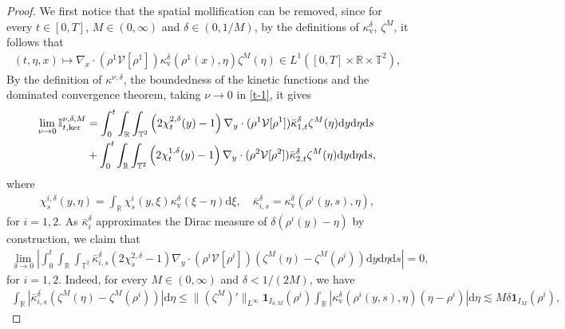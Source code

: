 \begin{proof}
We first notice that the spatial mollification can be removed, since for every $t\in[0,T]$, $M\in(0,\infty)$ and $\delta\in(0,1/M)$, by the definitions of $\kappa_{\mathrm{v}}^{\delta}$, $\zeta^M$, it follows that
\begin{align*}
(t, \eta, x) \mapsto \nabla_x\cdot \left( \rho^1 \mathcal{V}[\rho^1] \right) {\kappa}_{\mathrm{v}}^{\delta}\left(\rho^1(x),\eta\right)\zeta^M(\eta) \in L^1([0,T]\times\mathbb{R}\times\mathbb{T}^2),
\end{align*}
By  the
definition of $\kappa^{\nu,\delta}$, the boundedness of the kinetic functions and the dominated convergence theorem,  taking $\nu\rightarrow 0$ in \eqref{t-1}, it gives
\begin{align}\label{WS kernel delta}
\lim_{\nu\rightarrow 0}\mathbb{I}^{\nu,\delta,M}_{t,\mathrm{ker}}
&= \int^t_0\int_{\mathbb{R}}\int_{\mathbb{T}^2}\left(2\chi^{2,\delta}_t(y)-1\right)  \nabla_y\cdot (\rho^1 \mathcal{V}[\rho^1] ) \bar{\kappa}^{\delta}_{1,t}\zeta^M(\eta)\mathrm{d}y\mathrm{d}\eta\mathrm{d}s\\ \notag
& + \int^t_0\int_{\mathbb{R}}\int_{\mathbb{T}^2}\left(2\chi^{1,\delta}_t(y)-1\right)  \nabla_y\cdot(\rho^2  \mathcal{V}[\rho^2] ) \bar{\kappa}^{\delta}_{2,t}\zeta^M(\eta)\mathrm{d}y\mathrm{d}\eta\mathrm{d}s,
\end{align}
where
\begin{align*}
\chi_s^{i,\delta}(y,\eta)=\int_{\mathbb{R}}\chi^i_s(y,\xi) \kappa^{\delta}_{\mathrm{v}}(\xi-\eta)\mathrm{d}\xi, \quad \bar{\kappa}^{\delta}_{i,s} = \kappa_{\mathrm{v}}^{\delta}(\rho^i(y,s),\eta),
\end{align*}
for $i = 1,2$. As $\bar{\kappa}^{\delta}_{i}$ approximates the Dirac measure of $\delta(\rho^i(y)-\eta)$ by construction, we claim that 
\begin{align}\label{t-2}
\lim_{\delta\rightarrow 0}\left|\int^t_0 \int_{\mathbb{R}}\int_{\mathbb{T}^2}\bar{\kappa}^{\delta}_{i,s}\left(2\chi^{2,\delta}_s-1\right)\nabla_y\cdot\left(\rho^i\mathcal{V}[\rho^i]\right) \left(\zeta^M(\eta)-\zeta^M(\rho^i)\right)\mathrm{d}y\mathrm{d}\eta \mathrm{d}s\right|=0, 
\end{align}
for $i = 1,2$. Indeed, for every  $M\in(0,\infty)$ and $\delta < 1/(2M)$, we have 
\begin{align*}
\int_{\mathbb{R}}\left|\bar{\kappa}^{\delta}_{i,s}\left(\zeta^M(\eta)-\zeta^M(\rho^i)\right)\right|\mathrm{d}\eta \leq \|(\zeta^M)'\|_{L^{\infty}} \mathbf{1}_{I_{\delta,M}}(\rho^i)\int_{\mathbb{R}}\left|\kappa_{\mathrm{v}}^{\delta}(\rho^i(y,s),\eta)\left(\eta-\rho^i\right)\right|\mathrm{d}\eta \lesssim M\delta \mathbf{1}_{I_{M}}(\rho^i),

\end{align*}
\end{proof}
